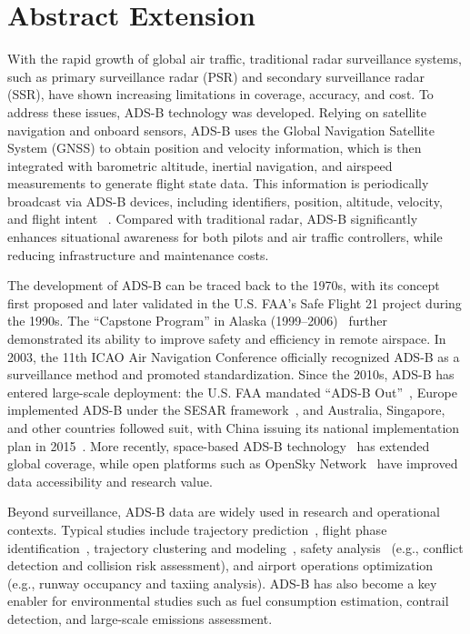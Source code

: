 \section{Abstract Extension}

With the rapid growth of global air traffic, traditional radar surveillance systems, such as primary surveillance radar (PSR) and secondary surveillance radar (SSR), have shown increasing limitations in coverage, accuracy, and cost. To address these issues, ADS-B technology was developed. Relying on satellite navigation and onboard sensors, ADS-B uses the Global Navigation Satellite System (GNSS) to obtain position and velocity information, which is then integrated with barometric altitude, inertial navigation, and airspeed measurements to generate flight state data. This information is periodically broadcast via ADS-B devices, including identifiers, position, altitude, velocity, and flight intent ~\cite{olive2024filtering}. Compared with traditional radar, ADS-B significantly enhances situational awareness for both pilots and air traffic controllers, while reducing infrastructure and maintenance costs.

The development of ADS-B can be traced back to the 1970s, with its concept first proposed and later validated in the U.S. FAA’s Safe Flight 21 project during the 1990s. The “Capstone Program” in Alaska (1999–2006)~\cite{faa2000capstone} further demonstrated its ability to improve safety and efficiency in remote airspace. In 2003, the 11th ICAO Air Navigation Conference officially recognized ADS-B as a surveillance method and promoted standardization. Since the 2010s, ADS-B has entered large-scale deployment: the U.S. FAA mandated “ADS-B Out”~\cite{cfr91-225}, Europe implemented ADS-B under the SESAR framework~\cite{undertaking2009european}, and Australia, Singapore, and other countries followed suit, with China issuing its national implementation plan in 2015~\cite{caac2015adsb}. More recently, space-based ADS-B technology~\cite{melero2024satera} has extended global coverage, while open platforms such as OpenSky Network~\cite{schafer2014bringing} have improved data accessibility and research value.

Beyond surveillance, ADS-B data are widely used in research and operational contexts. Typical studies include trajectory prediction~\cite{wang2021performance,corrado2021clustering}, flight phase identification~\cite{schlosser2024analysis}, trajectory clustering and modeling~\cite{guleriamachine}, safety analysis~\cite{noh2018aviation} (e.g., conflict detection and collision risk assessment), and airport operations optimization~\cite{roosenbrand2023contrail} (e.g., runway occupancy and taxiing analysis). ADS-B has also become a key enabler for environmental studies such as fuel consumption estimation, contrail detection, and large-scale emissions assessment.


